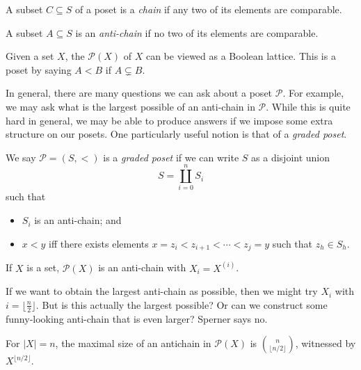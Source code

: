 \documentclass[a4paper]{article}
\begin{document}
\begin{defi}[Chain]
  A subset $C \subseteq S$ of a poset is a \emph{chain} if any two of its elements are comparable.
\end{defi}

\begin{defi}
  A subset $A \subseteq S$ is an \emph{anti-chain} if no two of its elements are comparable.
\end{defi}

Given a set $X$, the  $\mathcal{P}(X)$ of $X$ can be viewed as a Boolean lattice. This is a poset by saying $A < B$ if $A \subsetneq B$.

In general, there are many questions we can ask about a poset $\mathcal{P}$. For example, we may ask what is the largest possible of an anti-chain in $\mathcal{P}$. While this is quite hard in general, we may be able to produce answers if we impose some extra structure on our posets. One particularly useful notion is that of a \emph{graded poset}.

\begin{defi}
  We say $\mathcal{P} = (S, <)$ is a \emph{graded poset} if we can write $S$ as a disjoint union
  \[
    S = \coprod_{i = 0}^n S_i %
  \]
  such that
  \begin{itemize}
    \item $S_i$ is an anti-chain; and
    \item $x < y$ iff there exists elements $x = z_i < z_{i + 1} < \cdots < z_j = y$ such that $z_h \in S_h$.
  \end{itemize}
\end{defi}

\begin{eg}
  If $X$ is a set, $\mathcal{P}(X)$ is an anti-chain with $X_i = X^{(i)}$.
\end{eg}
If we want to obtain the largest anti-chain as possible, then we might try $X_i$ with $i = \lfloor \frac{n}{2}\rfloor$. But is this actually the largest possible? Or can we construct some funny-looking anti-chain that is even larger? Sperner says no.

\begin{thm}[Sperner, 1928]
  For $|X| = n$, the maximal size of an antichain in $\mathcal{P}(X)$ is $\binom{n}{\lfloor n/2\rfloor}$, witnessed by $X^{\lfloor n/2\rfloor}$.
\end{thm}
\end{document}
